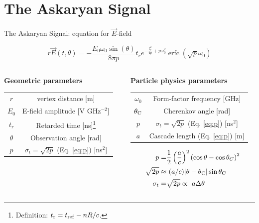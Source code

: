 \documentclass{beamer}
\DeclareMathOperator\erfc{erfc}
\begin{document}
\section{The Askaryan Signal}

\begin{frame}{The Askaryan Signal: equation for $\vec{E}$-field}
\begin{tcolorbox}[colback=box_background,colframe=box_frame,title={Askaryan electric field, $\vec{E}(r,t)$, [V m$^{-1}$]}]
\begin{equation}
r \vec{E}(t,\theta) = -\frac{E_0 \omega_0 \sin(\theta)}{8 \pi p} t_r e^{-\frac{t_r^2}{4p} + p \omega_0^2}\erfc(\sqrt{p}\omega_0)
\end{equation}
\end{tcolorbox}
\footnotesize
\begin{columns}[T]
\begin{column}{0.49\textwidth}
\textbf{Geometric parameters}
\begin{table}
\centering
\begin{tabular}{c|c}
$r$ & vertex distance [m] \\
$E_0$ & E-field amplitude [V GHz$^{-2}$] \\
$t_r$ & Retarded time [ns]\footnote{Definition: $t_{\rm r} = t_{\rm ref} - nR/c$.} \\
$\theta$ & Observation angle [rad] \\
$p$ & $\sigma_t = \sqrt{2p}$ (Eq. \ref{eq:p}) [ns$^2$]
\end{tabular}
\end{table}
\end{column}
\begin{column}{0.49\textwidth}
\textbf{Particle physics parameters}
\begin{table}
\centering
\begin{tabular}{c|c}
$\omega_0$ & Form-factor frequency [GHz] \\
$\theta_{\rm C}$ & Cherenkov angle [rad] \\
$p$ & $\sigma_t = \sqrt{2p}$ (Eq. \ref{eq:p}) [ns$^2$] \\
$a$ & Cascade length (Eq. \ref{eq:p}) [m]
\end{tabular}
\end{table}
\begin{align}
p =& \frac{1}{2}\left(\frac{a}{c}\right)^2 \left(\cos\theta - \cos\theta_C\right)^2 \label{eq:p} \\
\sqrt{2p} \approx & ~(a/c)|\theta - \theta_{\rm C}|\sin\theta_{\rm C} \\
\sigma_t =& \sqrt{2p} \propto ~ a\Delta\theta
\end{align}
\end{column}
\end{columns}
\end{frame}
\end{document}
